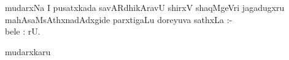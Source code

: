 \thispagestyle{empty}
\begin{center}
mudarxNa
\vfill
I pusatxkada savARdhikAravU shirxV shaqMgeVri jagadugxru\\
mahAsaMsAthxnadAdxgide
\vfill
parxtigaLu doreyuva sathxLa :-\\

\vfill
bele : rU.

\vfill

mudarxkaru

\end{center}
